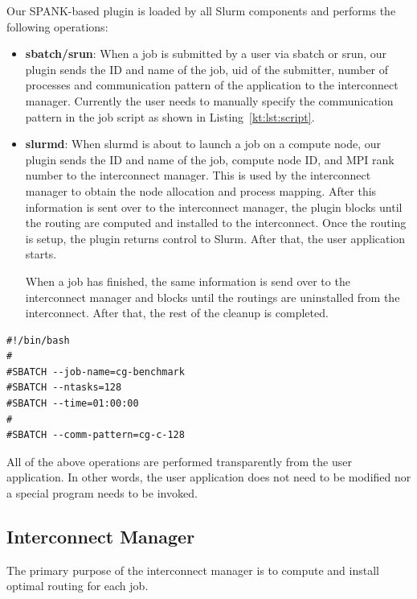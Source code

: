 \documentclass[graybox]{svmult}
\begin{document}
Our SPANK-based plugin is loaded by all Slurm components and performs the
following operations:

\begin{itemize}
    \item \textbf{sbatch/srun}: When a job is submitted by a user via sbatch
        or srun, our plugin sends the ID and name of the job, uid of the
        submitter, number of processes and communication pattern of the
        application to the interconnect manager. Currently the user
        needs to manually specify the communication pattern in the job script
        as shown in Listing~\ref{kt:lst:script}.
    \item \textbf{slurmd}: When slurmd is about to launch a job on a compute
        node, our plugin sends the ID and name of the job, compute node ID,
        and MPI rank number to the interconnect manager. This is used by the
        interconnect manager to obtain the node allocation and process
        mapping. After this information is sent over to the interconnect
        manager, the plugin blocks until the routing are computed and
        installed to the interconnect. Once the routing is setup, the plugin
        returns control to Slurm. After that, the user application starts.

        When a job has finished, the same information is send over to the
        interconnect manager and blocks until the routings are uninstalled
        from the interconnect. After that, the rest of the cleanup is
        completed.
\end{itemize}

\begin{lstlisting}[float,caption=An example of a job script,label=kt:lst:script]
#!/bin/bash
#
#SBATCH --job-name=cg-benchmark
#SBATCH --ntasks=128
#SBATCH --time=01:00:00
#
#SBATCH --comm-pattern=cg-c-128
\end{lstlisting}

All of the above operations are performed transparently from the user
application. In other words, the user application does not need to be modified
nor a special program needs to be invoked.

\subsection{Interconnect Manager}

The primary purpose of the interconnect manager is to compute and install
optimal routing for each job.
\end{document}
